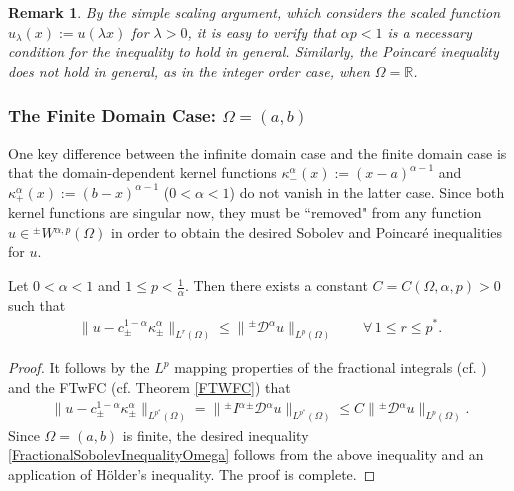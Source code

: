 \documentclass[leqno,final]{siamltex}
\numberwithin{equation}{section}
\newtheorem{remark}{Remark}[section]
\renewcommand{\(}{\bigl(}
\renewcommand{\)}{\bigr)}
\newcommand{\R}{\mathbb{R}}
\begin{document}
   \begin{remark}
   	By the simple scaling argument, which considers the scaled function $u_{\lambda}(x) := u(\lambda x)$ for $\lambda >0$,
   	it is easy to verify that $\alpha p<1$ is a necessary condition for the inequality to hold in general. 
   	Similarly, the Poincar\'e inequality  does not hold in general, as in the integer order case, when $\Omega=\R$. 
   \end{remark}
   
   
   \subsubsection{\bf The Finite Domain Case: $\Omega=(a,b)$}\label{sec-4.4.2}
   One key difference between the infinite domain case and the finite domain case is 
   that the domain-dependent kernel functions $\kappa^{\alpha}_{-}(x):=(x-a)^{\alpha-1}$ and 
   $\kappa^{\alpha}_{+}(x):=(b-x)^{\alpha-1}$ ($0<\alpha<1$) do not vanish in the 
   latter case. Since both kernel
   functions are singular now, they must be ``removed" from any function $u\in {^{\pm}}{W}{^{\alpha,p}}(\Omega)$
   in order to obtain the desired Sobolev and Poincar\'e inequalities for $u$.   
  
   
   \begin{theorem}
   	Let $0<\alpha<1$ and $1 \leq  p < \frac{1}{\alpha}$.
   	Then there exists a constant $C = C(\Omega , \alpha, p) > 0$ such that
   	\begin{align}\label{FractionalSobolevInequalityOmega}
   	\|u - c_{\pm}^{1-\alpha} \kappa_{\pm}^{\alpha} \|_{L^{r}(\Omega)} \leq \|{^{\pm}}{\mathcal{D}}{^{\alpha}} u\|_{L^p(\Omega)} \qquad \forall \, 1 \leq r \leq p^*.
   	\end{align}
   \end{theorem}
   
   \begin{proof}
   	It follows by the $L^p$ mapping properties of the fractional integrals 
   	(cf. \cite[Theorem 2.6]{Feng_Sutton}) and the FTwFC (cf. Theorem \ref{FTWFC}) %
   	that 
   	\begin{align*}
   	\|u - c_{\pm}^{1-\alpha} \kappa^{\alpha}_{\pm} \|_{L^{p^*}(\Omega)} = \| {^{\pm}}{I}{^{\alpha}} {^{\pm}}{\mathcal{D}}{^{\alpha}} u\|_{L^{p^*}(\Omega)}  
   	\leq C \| {^{\pm}}{\mathcal{D}}{^{\alpha}} u \|_{L^{p}(\Omega)}.
   	\end{align*}
   	Since $\Omega=(a,b)$ is finite,  the desired inequality \eqref{FractionalSobolevInequalityOmega} follows from 
   	the above inequality and an application of H\"older's inequality. The proof is complete. 
   \end{proof}
   
\end{document}
